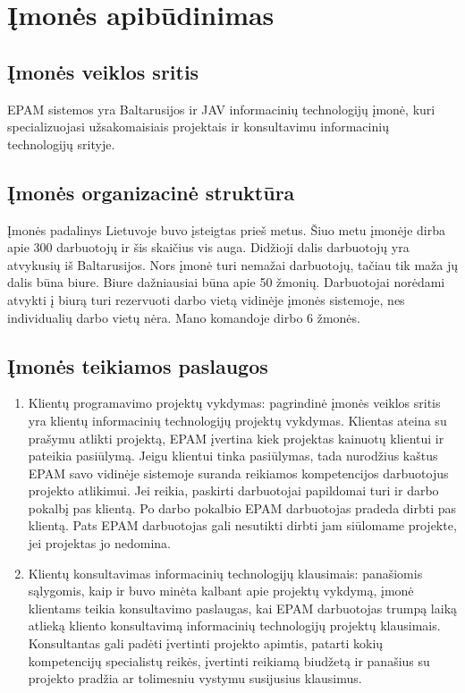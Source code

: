 \documentclass{VUMIFPSkursinis}
\begin{document}
\section{Įmonės apibūdinimas}
	\subsection{Įmonės veiklos sritis}
		EPAM sistemos yra Baltarusijos ir JAV informacinių technologijų įmonė, kuri specializuojasi užsakomaisiais
		projektais ir konsultavimu informacinių technologijų srityje. 		
		
	\subsection{Įmonės organizacinė struktūra}
		Įmonės padalinys Lietuvoje buvo įsteigtas prieš metus. 
		Šiuo metu įmonėje dirba apie 300 darbuotojų ir šis skaičius vis auga. 
		Didžioji dalis darbuotojų yra atvykusių iš Baltarusijos.
		Nors įmonė turi nemažai darbuotojų, tačiau tik maža jų dalis būna biure.
		Biure dažniausiai būna apie 50 žmonių.
		Darbuotojai norėdami atvykti į biurą turi rezervuoti darbo vietą vidinėje įmonės sistemoje, nes individualių
		darbo vietų nėra.
		Mano komandoje dirbo 6 žmonės.
		
	\subsection{Įmonės teikiamos paslaugos}
		\begin{enumerate}
			\item{
			Klientų programavimo projektų vykdymas: pagrindinė įmonės veiklos sritis yra klientų informacinių technologijų
		projektų vykdymas. Klientas ateina su prašymu atlikti projektą, EPAM įvertina kiek projektas kainuotų klientui
			ir pateikia pasiūlymą. Jeigu klientui tinka pasiūlymas, tada nurodžius kaštus EPAM savo vidinėje sistemoje 
			suranda reikiamos kompetencijos darbuotojus projekto atlikimui. Jei reikia, paskirti darbuotojai papildomai turi ir
			darbo pokalbį pas klientą.
			Po darbo pokalbio EPAM darbuotojas pradeda dirbti pas klientą.
			Pats EPAM darbuotojas gali nesutikti dirbti jam siūlomame projekte, jei projektas jo nedomina.
			}
			
			\item{
			Klientų konsultavimas informacinių technologijų klausimais: panašiomis sąlygomis, kaip ir buvo minėta kalbant apie
			projektų vykdymą, įmonė klientams teikia konsultavimo paslaugas, kai EPAM darbuotojas trumpą laiką
			atlieką kliento konsultavimą informacinių technologijų projektų klausimais.
			Konsultantas gali padėti įvertinti projekto apimtis, patarti kokių kompetencijų specialistų reikės,
			įvertinti reikiamą biudžetą ir panašius su projekto pradžia ar tolimesniu vystymu susijusius klausimus.		
			}
		\end{enumerate}
\end{document}

